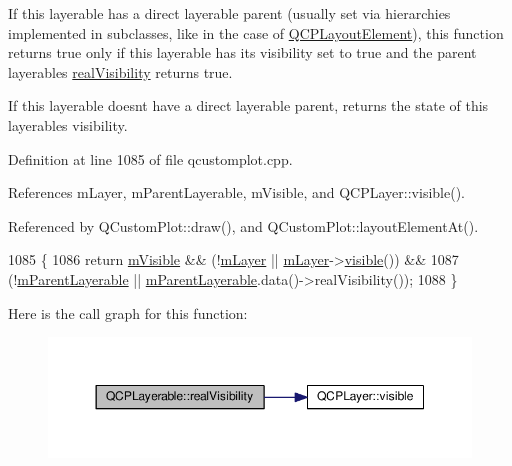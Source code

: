 If this layerable has a direct layerable parent (usually set via hierarchies implemented in subclasses, like in the case of \hyperlink{class_q_c_p_layout_element}{Q\+C\+P\+Layout\+Element}), this function returns true only if this layerable has its visibility set to true and the parent layerable\textquotesingle{}s \hyperlink{class_q_c_p_layerable_a30809f7455e9794bca7b6c737622fa63}{real\+Visibility} returns true.

If this layerable doesn\textquotesingle{}t have a direct layerable parent, returns the state of this layerable\textquotesingle{}s visibility. 

Definition at line 1085 of file qcustomplot.\+cpp.



References m\+Layer, m\+Parent\+Layerable, m\+Visible, and Q\+C\+P\+Layer\+::visible().



Referenced by Q\+Custom\+Plot\+::draw(), and Q\+Custom\+Plot\+::layout\+Element\+At().


\begin{DoxyCode}
1085                                         \{
1086   \textcolor{keywordflow}{return} \hyperlink{class_q_c_p_layerable_a62e3aed8427d6ce3ccf716f285106cb3}{mVisible} && (!\hyperlink{class_q_c_p_layerable_aa38ec5891aff0f50b36fd63e9372a0cd}{mLayer} || \hyperlink{class_q_c_p_layerable_aa38ec5891aff0f50b36fd63e9372a0cd}{mLayer}->\hyperlink{class_q_c_p_layer_a9efca636e4dcad721999a6282f296016}{visible}()) &&
1087          (!\hyperlink{class_q_c_p_layerable_a3291445a980053e2d17a21d15957624e}{mParentLayerable} || \hyperlink{class_q_c_p_layerable_a3291445a980053e2d17a21d15957624e}{mParentLayerable}.data()->realVisibility());
1088 \}
\end{DoxyCode}


Here is the call graph for this function\+:\nopagebreak
\begin{figure}[H]
\begin{center}
\leavevmode
\includegraphics[width=350pt]{class_q_c_p_layerable_a30809f7455e9794bca7b6c737622fa63_cgraph}
\end{center}
\end{figure}




